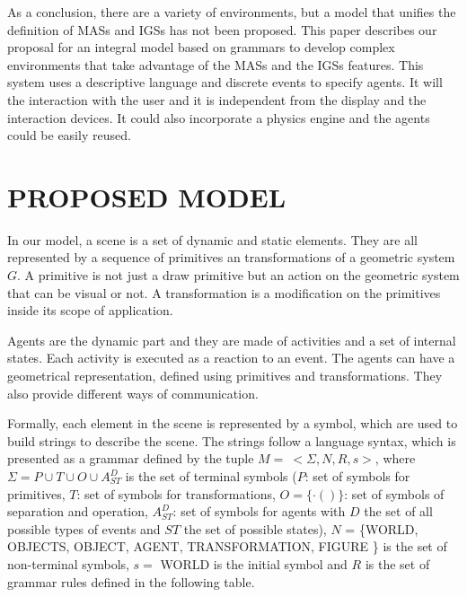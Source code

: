 \documentclass[a4paper,twoside]{article}
\begin{document}
As a conclusion, there are a variety of environments, but a model that unifies the definition of
MASs and IGSs has not been proposed. This paper describes our proposal for an integral model based
on grammars to develop complex environments that take advantage of the MASs and the IGSs features.
This system uses a descriptive language and discrete events to specify agents. It will the
interaction with the user and it is independent from the display and the interaction devices. It
could also incorporate a physics engine and the agents could be easily reused.


\section{\uppercase{Proposed Model}
\label{sec:model}}

\noindent In our model, a scene is a set of dynamic and static elements. They are all represented
by a sequence of primitives an transformations of a geometric system $G$. A primitive is not just a
draw primitive but an action on the geometric system that can be visual or not. A transformation is
a modification on the primitives inside its scope of application.

Agents are the dynamic part and they are made of activities and a set of internal states. Each
activity is executed as a reaction to an event. The agents can have a geometrical representation,
defined using primitives and transformations. They also provide different ways of communication.

Formally, each element in the scene is represented by a symbol, which are used to build strings to
describe the scene. The strings follow a language syntax, which is presented as a grammar
\cite{Davis1994} defined by the tuple $M= \ <\Sigma, N, R, s>$, where $\Sigma = P \cup T \cup O
\cup A^D_{ST}$ is the set of terminal symbols ($P$: set of symbols for primitives, $T$: set of
symbols for transformations, $O = \{ \cdotp ( ) \}$: set of symbols of separation and operation,
$A^D_{ST}$: set of symbols for agents with $D$ the set of all possible types of events and $ST$ the
set of possible states), $N$ = \{WORLD, OBJECTS, OBJECT, AGENT, TRANSFORMATION, FIGURE \} is the
set of non-terminal symbols, $s =$ WORLD is the initial symbol and $R$ is the set of grammar rules
defined in the following table.
\end{document}
